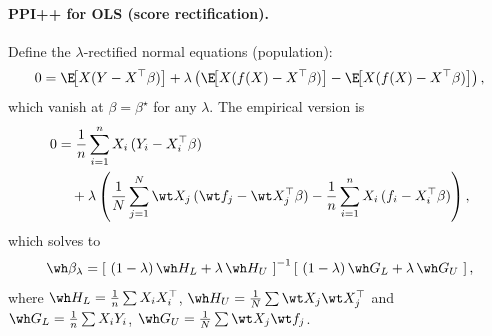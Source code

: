 \paragraph{PPI++ for OLS (score rectification).}
Define the $\lambda$-rectified normal equations (population):
\[
0
=
\E\!\big[X(Y-X^\top\beta)\big]
+\lambda\left(\E\!\big[X(f(X)-X^\top\beta)\big]-\E\!\big[X(f(X)-X^\top\beta)\big]\right),
\]
which vanish at $\beta=\beta^\star$ for any $\lambda$. The empirical version is
\begin{align*}
0
&=
\frac{1}{n}\sum_{i=1}^n X_i\,(Y_i-X_i^\top\beta)
\\
&\quad + \lambda\left(
\frac{1}{N}\sum_{j=1}^N \wt X_j\,(\wt f_j-\wt X_j^\top\beta)
-
\frac{1}{n}\sum_{i=1}^n X_i\,(f_i-X_i^\top\beta)
\right),
\end{align*}
which solves to
\begin{equation}\label{eq:ppi++-ols}
\wh\beta_\lambda
=
\left[\ (1-\lambda)\,\wh H_L + \lambda\,\wh H_U \ \right]^{-1}
\left[\ (1-\lambda)\,\wh G_L + \lambda\,\wh G_U \ \right],
\end{equation}
where $\wh H_L=\frac{1}{n}\sum X_iX_i^\top$, $\wh H_U=\frac{1}{N}\sum \wt X_j \wt X_j^\top$ and $\wh G_L=\frac{1}{n}\sum X_iY_i$, $\wh G_U=\frac{1}{N}\sum \wt X_j \wt f_j$. 



